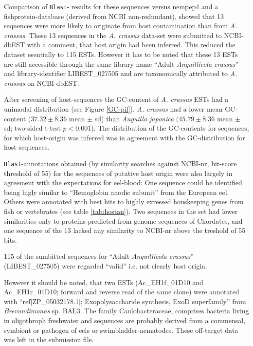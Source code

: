 Comparison of \texttt{Blast}- results for these sequences versus
nempep4 and a fishprotein-database (derived from NCBI non-redundant),
showed that 13 sequences were more likely to originate from host
contamination than from \textit{A. crassus}. These 13 sequences in the
\textit{A. crassus} data-set were submitted to NCBI-dbEST with a
comment, that host origin had been inferred. This reduced the dataset
esentially to 115 ESTs. However it has to be noted that these 13 ESTs
are still accessible through the same library name ``Adult
\textit{Anguillicola crassus}'' and library-identifier LIBEST\_027505
and are taxonomically attributed to \textit{A. crassus} on NCBI-dbEST.


After screening of host-sequences the GC-content of
\textit{A. crassus} ESTs had a unimodal distribution (see Figure
\ref{GC-pil}). \textit{A. crassus} had a lower mean GC-content $(37.32
\pm 8.36$ mean $\pm$ sd) than \textit{Anguilla japonica} $(45.79 \pm
8.36$ mean $\pm$ sd; two-sided t-test $p<0.001$). The distribution of
the GC-contents for sequences, for which host-origin was inferred was
in agreement with the GC-distribution for host sequences.

\texttt{Blast}-annotations obtained (by similarity searches against
NCBI-nr, bit-score threshold of 55) for the sequences of putative host
origin were also largely in agreement with the expectations for
eel-blood: One sequence could be identified being higly similar to
``Hemoglobin anodic subunit'' from the European eel. Others were
annotated with best hits to highly exressed houskeeping genes from
fish or vertebrates (see table \ref{tab:hostan}). Two sequences in the
set had lower similarities only to proteins predicted from
genome-sequences of Chordates, and one sequence of the 13 lacked any
similarity to NCBI-nr above the treshold of 55 bits.

115 of the sumbitted sequences for ``Adult \textit{Anguillicola
  crassus}'' (LIBEST\_027505) were regarded ``valid'' i.e. not clearly
host origin. 

However it should be noted, that two ESTs (Ac\_EH1f\_01D10 and
Ac\_EH1r\_01D10; forward and reverse read of the same clone) were
annotated with ``ref$|$ZP\_05032178.1$|$; Exopolysaccharide synthesis,
ExoD superfamily'' from \textit{Brevundimonas} sp. BAL3. The family
Caulobacteraceae, comprises bacteria living in oligothroph freshwater
and sequences are probably derived from a commensal, symbiont or
pathogen of eels or swimbladder-nematodes. These off-target data was
left in the submission file.

